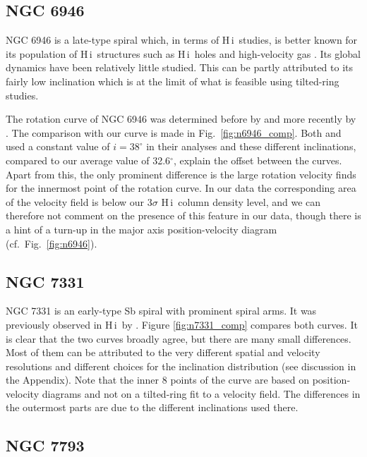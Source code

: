 \documentclass[usenatbib,usegraphicx,apjfonts,floatfix]{emulateapj}
\newcommand{\HI}{H\,{\sc i}}
\begin{document}
\subsection{NGC 6946}

NGC 6946 is a late-type spiral which, in terms of \HI\ studies, is
better known for its population of \HI\ structures such as \HI\ holes
and high-velocity gas \citep[e.g.,][]{kamphuis,boomsma}. Its global
dynamics have been relatively little studied. This can be partly
attributed to its fairly low inclination which is at the limit of what
is feasible using tilted-ring studies.

The rotation curve of NGC 6946 was determined before by
\citet{carignan6946} and more recently by \citet{boomsma}.  The
comparison with our curve is made in Fig.\ \ref{fig:n6946_comp}. Both
\citet{carignan6946} and \citet{boomsma} used a constant value of $i =
38^{\circ}$ in their analyses and these different inclinations, compared to our average value of 32.6$^\circ$,  explain
the offset between the curves.  Apart from this, the only
prominent difference is the large rotation velocity \citet{boomsma}
finds for the innermost point of the rotation curve. In our data the
corresponding area of the velocity field is below our $3\sigma$ \HI\
column density level, and we can therefore not comment on the presence
of this feature in our data, though there is a hint of a turn-up in
the major axis position-velocity diagram (cf.~Fig.~\ref{fig:n6946}).

\subsection{NGC 7331}

NGC 7331 is an early-type Sb spiral with prominent spiral arms.  It
was previously observed in \HI\ by \citet{begeman87}.  Figure
\ref{fig:n7331_comp} compares both curves. It is clear that the two
curves broadly agree, but there are many small differences.  Most of
them can be attributed to the very different spatial and velocity
resolutions and different choices for the inclination distribution
(see discussion in the Appendix).  Note that the inner 8 points of the
\citet{begeman87} curve are based on position-velocity diagrams and
not on a tilted-ring fit to a velocity field. The differences in the
outermost parts are due to the different inclinations used there.

\subsection{NGC 7793\label{sect:7793}\label{sec:indiv_gal_end}}
\end{document}
